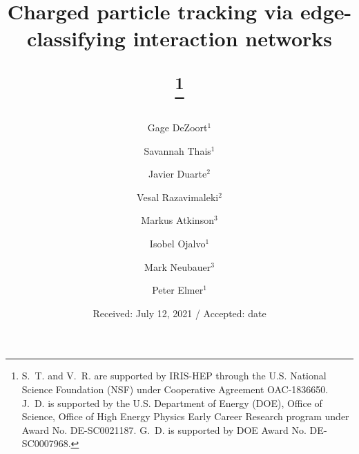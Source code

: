 \documentclass[twocolumn]{svjour3}
\begin{document}
\sloppy
\title{Charged particle tracking via edge-classifying interaction networks

\thanks{S.~T. and V.~R. are supported by IRIS-HEP through the U.S. National Science Foundation (NSF) under Cooperative Agreement OAC-1836650.
J.~D. is supported by the U.S. Department of Energy (DOE), Office of Science, Office of High Energy Physics Early Career Research program under Award No. DE-SC0021187.
G.~D. is supported by DOE Award No. DE‐SC0007968.}
}

\author{Gage DeZoort$^{1}$ \and
Savannah Thais$^{1}$ \and
Javier Duarte$^{2}$\and
Vesal Razavimaleki$^{2}$ \and
Markus Atkinson$^{3}$ \and
Isobel Ojalvo$^{1}$ \and
Mark Neubauer$^{3}$ \and
Peter Elmer$^{1}$
}




\date{Received: July 12, 2021 / Accepted: date}

\maketitle
\end{document}
